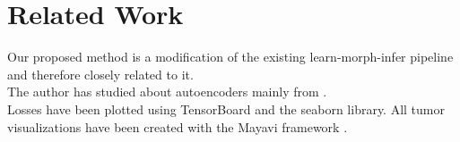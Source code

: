 
\chapter{Related Work}\label{chapter:related_work}

Our proposed method is a modification of the existing learn-morph-infer pipeline \parencite{LearnMorphInfer} and therefore closely related to it.
\\
The author has studied about autoencoders mainly from \parencite{Goodfellow-et-al-2016}.\\
Losses have been plotted using TensorBoard and the seaborn library. All tumor visualizations have been created with the Mayavi framework .








